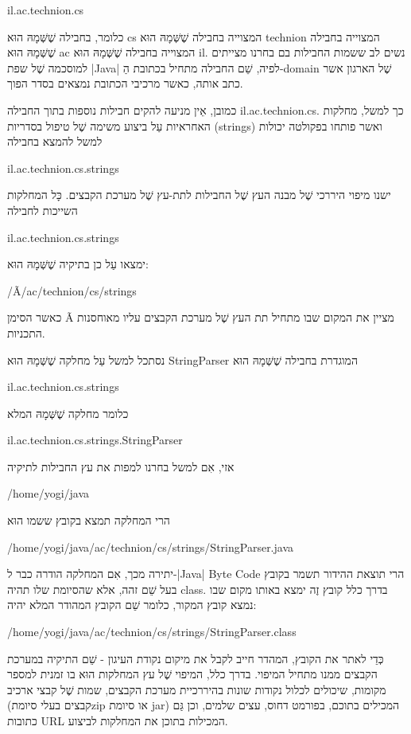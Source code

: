 il.ac.technion.cs

כלומר, בחבילה שֶׁשְּׁמָהּ הוּא cs המצוייה בחבילה שֶׁשְּׁמָהּ הוּא technion
המצוייה בחבילה שֶׁשְּׁמָהּ הוּא ac המצוייה בחבילה שֶׁשְּׁמָהּ הוּא il. נשים לב
ששמות החבילות בם בחרנו מצייתים למוסכמה שֶׁל שפת \E|Java| לפיה, שֵׁם החבילה מתחיל
בכתובת הַ-domain שֶׁל הארגון אשר כתב אותה, כאשר מרכיבי הכתובת נמצאים בסדר
הפוך.

כמובן, אֵין מניעה להקים חבילות נוספות בתוך החבילה il.ac.technion.cs. כך למשל,
מחלקות האחראיות עַל ביצוע משימה שֶׁל טיפול בסדריות (strings) ואשר פותחו בפקולטה
יכולות למשל להמצא בחבילה

il.ac.technion.cs.strings

ישנו מיפוי היררכי שֶׁל מבנה העץ שֶׁל החבילות לתת-עץ שֶׁל מערכת הקבצים. כָּל
המחלקות השייכות לחבילה

 il.ac.technion.cs.strings

ימצאו עַל כן בתיקיה שֶׁשְּׁמָהּ הוּא:

/Ã/ac/technion/cs/strings

כאשר הסימן Ã מציין את המקום שבו מתחיל תת העץ שֶׁל מערכת הקבצים עליו מאוחסנות
התכניות.

נסתכל למשל עַל מחלקה שֶׁשְּׁמָהּ הוּא StringParser המוגדרת בחבילה
שֶׁשְּׁמָהּ הוּא

 il.ac.technion.cs.strings

כלומר מחלקה שֶׁשְּׁמָהּ המלא

il.ac.technion.cs.strings.StringParser

אזי, אִם למשל בחרנו למפות את עץ החבילות לתיקיה

 /home/yogi/java

הרי המחלקה תמצא בקובץ ששמו הוּא

/home/yogi/java/ac/technion/cs/strings/StringParser.java

יתירה מכך, אִם המחלקה הודרה כבר ל-|Java| Byte Code הרי תוצאת ההידור תשמר
בקובץ בעל שֵׁם זהה, אלא שהסיומת שלו תהיה class. בדרך כלל קובץ זֶה ימצא באותו
מקום שבו נמצא קובץ המקור, כלומר שֵׁם הקובץ המהודר המלא יהיה:

/home/yogi/java/ac/technion/cs/strings/StringParser.class

כְּדֵי לאתר את הקובץ, המהדר חייב לקבל את מיקום נקודת העיגון - שֵׁם
התיקיה במערכת הקבצים ממנו מתחיל המיפוי. בדרך כלל, המיפוי שֶׁל עץ המחלקות
הוּא בו זמנית למספר מקומות, שיכולים לכלול נקודות שונות בהיררכיית מערכת הקבצים,
שמות שֶׁל קבצי ארכיב (קבצים בעלי סיומתzip או סיומת jar) המכילים בתוכם, בפורמט
דחוס, עצים שלמים, וכן גַּם כתובות URL המכילות בתוכן את המחלקות לביצוע.

